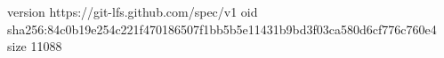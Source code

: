 version https://git-lfs.github.com/spec/v1
oid sha256:84c0b19e254c221f470186507f1bb5b5e11431b9bd3f03ca580d6cf776c760e4
size 11088
